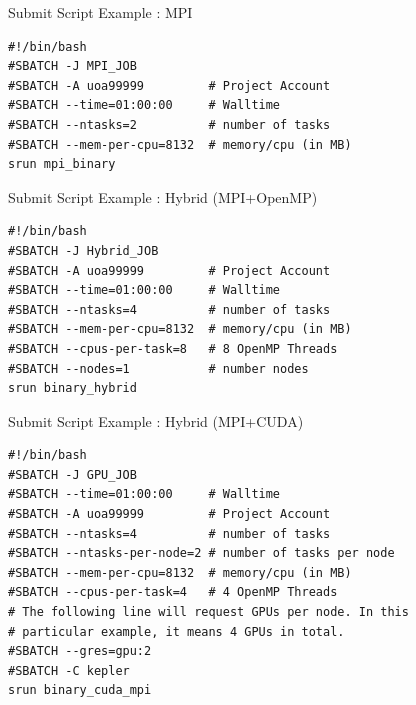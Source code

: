 \documentclass[final,t]{beamer}
\begin{document}
\begin{frame}[fragile]{}
\begin{columns}[t]
\begin{column}{.3\linewidth}
      \begin{block}{Submit Script Example : MPI}
              \vspace*{-3ex}
        \begin{verbatim}
#!/bin/bash
#SBATCH -J MPI_JOB
#SBATCH -A uoa99999         # Project Account
#SBATCH --time=01:00:00     # Walltime
#SBATCH --ntasks=2          # number of tasks
#SBATCH --mem-per-cpu=8132  # memory/cpu (in MB)
srun mpi_binary
        \end{verbatim}
                \vspace*{-4ex}
      \end{block}

      \begin{block}{Submit Script Example : Hybrid (MPI+OpenMP)}
              \vspace*{-3ex}
        \begin{verbatim}
#!/bin/bash
#SBATCH -J Hybrid_JOB
#SBATCH -A uoa99999         # Project Account
#SBATCH --time=01:00:00     # Walltime
#SBATCH --ntasks=4          # number of tasks
#SBATCH --mem-per-cpu=8132  # memory/cpu (in MB)
#SBATCH --cpus-per-task=8   # 8 OpenMP Threads
#SBATCH --nodes=1           # number nodes
srun binary_hybrid
        \end{verbatim}
                \vspace*{-4ex}
      \end{block}

      \begin{block}{Submit Script Example : Hybrid (MPI+CUDA)}
              \vspace*{-3ex}
        \begin{verbatim}
#!/bin/bash
#SBATCH -J GPU_JOB
#SBATCH --time=01:00:00     # Walltime
#SBATCH -A uoa99999         # Project Account
#SBATCH --ntasks=4          # number of tasks
#SBATCH --ntasks-per-node=2 # number of tasks per node
#SBATCH --mem-per-cpu=8132  # memory/cpu (in MB)
#SBATCH --cpus-per-task=4   # 4 OpenMP Threads
# The following line will request GPUs per node. In this  
# particular example, it means 4 GPUs in total.
#SBATCH --gres=gpu:2       
#SBATCH -C kepler
srun binary_cuda_mpi
        \end{verbatim}
                \vspace*{-4ex}
      \end{block}


\end{column}
\end{columns}
\end{frame}
\end{document}
